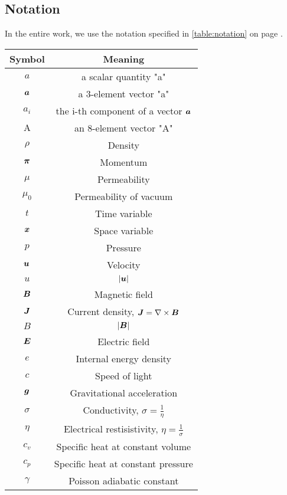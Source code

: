 \subsection{Notation}
In the entire work, we use the notation specified in \ref{table:notation} on page \pageref{table:notation}.

\begin{table}
    \centering
    \begin{tabular}{ |c|c| } 
        \hline
        Symbol & Meaning \\ 
        \hline
        $a$ & a scalar quantity "a"\\
        $\mbox{\boldmath $a$}$ & a 3-element vector "a"\\
        $a_i$ & the i-th component of a vector $\mbox{\boldmath $a$}$ \\
        $\mathrm{A}$ & an 8-element vector "A" \\
        \hline
        $\rho$ & Density \\ 
        $\mbox{\boldmath $\pi$}$ & Momentum \\ 
        $\mu$ & Permeability \\ 
        $\mu_0$ & Permeability of vacuum\\ 
        $t$ & Time variable\\ 
        $\mbox{\boldmath $x$}$ & Space variable \\ 
        $p$ & Pressure \\ 
        $\mbox{\boldmath $u$}$ & Velocity \\ 
        $u$ & $|\mbox{\boldmath $u$}|$ \\ 
        $\mbox{\boldmath $B$}$ & Magnetic field \\ 
        $\mbox{\boldmath $J$}$ & Current density, $\mbox{\boldmath $J$} = \nabla \times \mbox{\boldmath $B$}$ \\ 
        $B$ & $|\mbox{\boldmath $B$}|$ \\ 
        $\mbox{\boldmath $E$}$ & Electric field\\ 
        $e$ & Internal energy density \\ 
        $c$ & Speed of light\\ 
        $\mbox{\boldmath $g$}$ & Gravitational acceleration\\ 
        $\sigma$ & Conductivity, $\sigma = \frac{1}{\eta}$\\ 
        $\eta$ & Electrical restisistivity, $\eta = \frac{1}{\sigma}$\\
        $c_v$ & Specific heat at constant volume\\
        $c_p$ & Specific heat at constant pressure\\
        $\gamma$ & Poisson adiabatic constant\\

\end{tabular}
\end{table}
